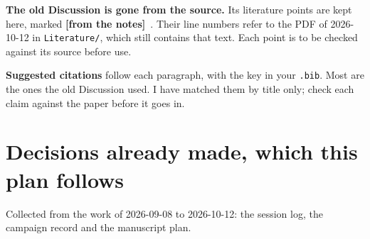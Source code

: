 \documentclass[11pt]{article}
\newcommand{\Note}{\textcolor{open}{\textbf{[from the notes]}}\ }
\begin{document}
\textbf{The old Discussion is gone from the source.} Its literature points
are kept here, marked \Note. Their line numbers refer to the PDF of
2026-10-12 in \texttt{Literature/}, which still contains that text. Each
point is to be checked against its source before use.

\textbf{Suggested citations} follow each paragraph, with the key in your
\texttt{.bib}. Most are the ones the old Discussion used. I have matched them
by title only; check each claim against the paper before it goes in.

\section*{Decisions already made, which this plan follows}

Collected from the work of 2026-09-08 to 2026-10-12: the session log, the
campaign record and the manuscript plan.
\end{document}
